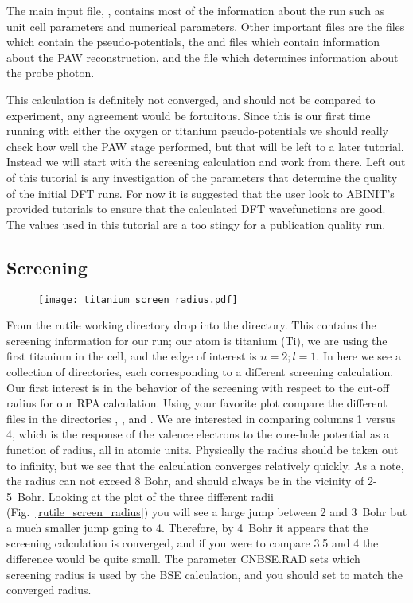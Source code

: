 \documentclass[11pt]{report}
\begin{document}
The main input file, , contains most of the information about the run such as unit cell parameters and numerical parameters. Other important files are the  files which contain the pseudo-potentials, the  and  files which contain information about the PAW reconstruction, and the  file which determines information about the probe photon. 

This calculation is definitely not converged, and should not be compared to experiment, any agreement would be fortuitous. Since this is our first time running with either the oxygen or titanium pseudo-potentials we should really check how well the PAW stage performed, but that will be left to a later tutorial. Instead we will start with the screening calculation and work from there. Left out of this tutorial is any investigation of the parameters that determine the quality of the initial DFT runs. For now it is suggested that the user look to ABINIT's provided tutorials to ensure that the calculated DFT wavefunctions are good. The values used in this tutorial are a too stingy for a publication quality run.

\subsection{Screening}

\begin{figure}
\texttt{[image: titanium\_screen\_radius.pdf]}
\label{titanium_screen_radius}
\end{figure}


From the rutile working directory drop into the  directory. This contains the screening information for our run; our atom is titanium (Ti), we are using the first titanium in the cell, and the edge of interest is $n=2;l=1$. In here we see a collection of directories, each corresponding to a different screening calculation. Our first interest is in the behavior of the screening with respect to the cut-off radius for our RPA calculation. Using your favorite plot compare the different  files in the directories , , and . We are interested in comparing columns 1 versus 4, which is the response of the valence electrons to the core-hole potential as a function of radius, all in atomic units. Physically the radius should be taken out to infinity, but we see that the calculation converges relatively quickly. As a note, the radius can not exceed 8 Bohr, and should always be in the vicinity of 2-5~Bohr. Looking at the plot of the three different radii (Fig.\ \ref{rutile_screen_radius}) you will see a large jump between 2 and 3~Bohr but a much smaller jump going to 4. Therefore, by 4~Bohr it appears that the screening calculation is converged, and if you were to compare 3.5 and 4 the difference would be quite small. The parameter CNBSE.RAD sets which screening radius is used by the BSE calculation, and you should set to match the converged radius.
\end{document}
